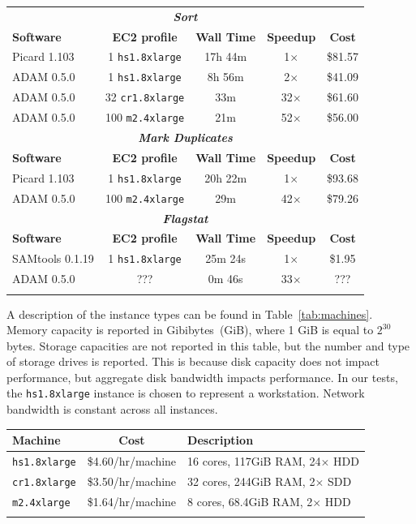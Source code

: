 \documentclass{bioinfo}
\begin{document}
\begin{table}[h]
{\begin{tabular}{ l c c c c }
\toprule
\multicolumn{5}{c}{\bf \textit{Sort}} \\
\bf Software & \bf EC2 profile & \bf Wall Time & \bf Speedup & \bf Cost \\
\midrule
Picard 1.103 & 1 \texttt{hs1.8xlarge} & 17h 44m & 1$\times$ & \$81.57 \\
ADAM 0.5.0 & 1 \texttt{hs1.8xlarge} & 8h 56m & 2$\times$ & \$41.09 \\
ADAM 0.5.0 & 32 \texttt{cr1.8xlarge} & 33m & 32$\times$ & \$61.60 \\
ADAM 0.5.0 & 100 \texttt{m2.4xlarge} & 21m & 52$\times$ & \$56.00 \\ 
\midrule
\multicolumn{5}{c}{\bf \textit{Mark Duplicates}} \\
\bf Software & \bf EC2 profile & \bf Wall Time & \bf Speedup & \bf Cost  \\
\midrule
Picard 1.103 & 1 \texttt{hs1.8xlarge} & 20h 22m & 1$\times$ & \$93.68 \\
ADAM 0.5.0 & 100 \texttt{m2.4xlarge} & 29m & 42$\times$ & \$79.26 \\
\midrule
\multicolumn{5}{c}{\bf \textit{Flagstat}} \\
\bf Software & \bf EC2 profile & \bf Wall Time & \bf Speedup & \bf Cost  \\
\midrule
SAMtools 0.1.19 & 1 \texttt{hs1.8xlarge} & 25m 24s & 1$\times$ & \$1.95 \\
ADAM 0.5.0 & ??? & 0m 46s & 33$\times$ & ??? \\
\botrule
\end{tabular}}{}
\end{table}

A description of the instance types can be found in Table~\ref{tab:machines}. Memory capacity is reported in Gibibytes~(GiB), where 1 GiB is equal to $2^{30}$ bytes. Storage
capacities are not reported in this table, but the number and type of storage drives is reported. This is because disk capacity does not impact performance, but aggregate
disk bandwidth impacts performance. In our tests, the \texttt{hs1.8xlarge} instance is chosen to represent a workstation. Network bandwidth is constant across all instances.

\begin{table}[h]
{\begin{tabular}{ l c l }
\toprule
\bf Machine & \bf Cost & \bf Description \\
\midrule
\texttt{hs1.8xlarge} & \$4.60/hr/machine & 16 cores, 117GiB RAM, 24$\times$ HDD \\
\texttt{cr1.8xlarge} & \$3.50/hr/machine & 32 cores, 244GiB RAM, 2$\times$ SDD \\
\texttt{m2.4xlarge} & \$1.64/hr/machine & 8 cores, 68.4GiB RAM, 2$\times$ HDD \\
\botrule
\end{tabular}}{}
\end{table}
\end{document}
